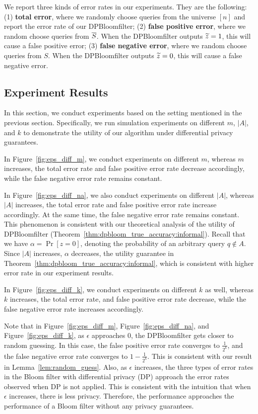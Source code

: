 We report three kinds of error rates in our experiments. They are the following: 
(1) {\bf total error}, where we randomly choose queries from the universe $[n]$ and report the error rate of our DPBloomfilter;
(2) {\bf false positive error}, where we random choose queries from $\overline{S}$. When the DPBloomfilter outputs $\widetilde{z} = 1$, this will cause a false positive error; 
(3) {\bf false negative error}, where we random choose queries from $S$. When the DPBloomfilter outputs $\widetilde{z} = 0$, this will cause a false negative error. 

\subsection{Experiment Results} \label{sec:exp:main_result}

In this section, we conduct experiments based on the setting mentioned in the previous section. Specifically, we run simulation experiments on different $m$, $|A|$, and $k$ to demonstrate the utility of our algorithm under differential privacy guarantees. 

In Figure~\ref{fig:eps_diff_m}, we conduct experiments on different $m$, whereas $m$ increases, the total error rate and false positive error rate decrease accordingly, while the false negative error rate remains constant. 

In Figure~\ref{fig:eps_diff_na}, we also conduct experiments on different $|A|$, whereas $|A|$ increases, the total error rate and false positive error rate increase accordingly. At the same time, the false negative error rate remains constant.
This phenomenon is consistent with our theoretical analysis of the utility of DPBloomfilter (Theorem~\ref{thm:dpbloom_true_accuracy:informal}). Recall that we have $\alpha = \Pr[z=0]$, denoting the probability of an arbitrary query $q \notin A$. 
Since $|A|$ increases, $\alpha$ decreases, the utility guarantee in Theorem~\ref{thm:dpbloom_true_accuracy:informal}, which is consistent with higher error rate in our experiment results. 


In Figure~\ref{fig:eps_diff_k}, we conduct experiments on different $k$ as well, whereas $k$ increases, the total error rate, and false positive error rate decrease, while the false negative error rate increases accordingly. 

Note that in Figure~\ref{fig:eps_diff_m}, Figure~\ref{fig:eps_diff_na}, and Figure~\ref{fig:eps_diff_k}, as $\epsilon$ approaches $0$, the DPBloomfilter gets closer to random guessing. In this case, the false positive error rate converges to $\frac{1}{2^k}$, and the false negative error rate converges to $1 - \frac{1}{2^k}$. This is consistent with our result in Lemma~\ref{lem:random_guess}. 
Also, as $\epsilon$ increases, the three types of error rates in the Bloom filter with differential privacy (DP) approach the error rates observed when DP is not applied. This is consistent with the intuition that when $\epsilon$ increases, there is less privacy. Therefore, the performance approaches the performance of a Bloom filter without any privacy guarantees. 

